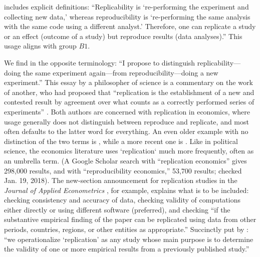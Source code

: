 \documentclass{statement}
\newlength{\up}
\begin{document}
\cite{stevens2017} includes explicit definitions: ``Replicability is `re-performing the experiment and collecting new data,' whereas reproducibility is `re-performing the same analysis with the same code using a different analyst.' Therefore, one can replicate a study or an effect (outcome of a study) but reproduce results (data analyses).''
This usage aligns with group $B1$.

We find in \cite{cartwright1991} the opposite terminology:
``I propose to distinguish replicability---doing the same experiment again---from reproducibility---doing a new experiment.'' 
This essay by a philosopher of science is a commentary on the work of another, who had proposed that ``replication is the establishment of a new and contested result by agreement over what counts as a correctly performed series of experiments''  \cite[]{collins1991}. 
Both authors are concerned with replication in economics, where usage generally does not distinguish between reproduce and replicate, and most often defaults to the latter word for everything. 
An even older example with no distinction of the two terms is \cite{dewaldETal1986}, while a more recent one is \cite{mccullough2008}. 
Like in political science, the economics literature uses `replication` much more frequently, often as an umbrella term. (A Google Scholar search with ``replication economics'' gives 298,000 results, and with ``reproducibility economics,'' 53,700 results; checked Jan. 19, 2018).
The new-section announcement for replication studies in the \emph{Journal of Applied Econometrics} \cite[]{pesaran2003}, for example, explains what is to be included: checking consistency and accuracy of data, checking validity of computations either directly or using different software (preferred), and checking ``if the substantive empirical finding of the paper can be replicated using data from other periods, countries, regions, or other entities as appropriate.'' 
Succinctly put by \cite{duvendackETal2017}: 
``we operationalize `replication' as any study whose main purpose is to determine the validity of one or more empirical results from a previously published study.''
\end{document}
